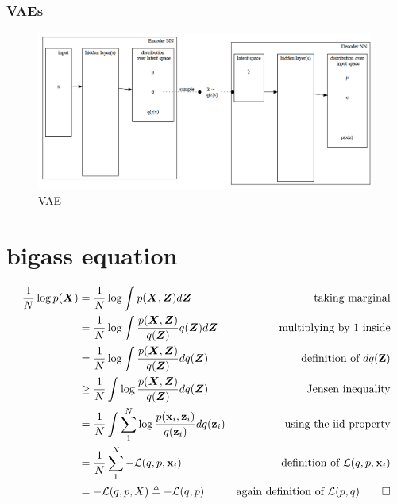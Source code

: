 \documentclass[final]{beamer}
\newcommand{\x}{\mathbf{x}}
\newcommand{\Z}{\mathbf{Z}}
\newcommand{\z}{\mathbf{z}}
\newcommand{\LL}{\mathcal{L}}
\newcommand{\bv}[1]{\boldsymbol{#1}}
\begin{document}
\begin{frame}
\frametitle{VAEs}
\begin{figure}[h]
\centering
\includegraphics[width=0.99\textwidth]{./plots/vaeNN.gv.png}
\caption{VAE}
\label{fig:vae}
\end{figure}
\end{frame}



\section{bigass equation}

\begin{frame}

{\tiny
\begin{equation}
\label{eq:elbo}
\begin{aligned}
\frac{1}{N} \log p(\bv{X}) &= \frac{1}{N} \log \int p(\bv{X},\bv{Z}) d\bv{Z} 
& \text{taking marginal} \\
& = \frac{1}{N} \log \int \frac{p(\bv{X},\bv{Z})}{q(\bv{Z})} q(\bv{Z})d\bv{Z} 
& \text{multiplying by 1 inside}\\
&=  \frac{1}{N} \log \int \frac{p(\bv{X},\bv{Z})}{q(\bv{Z})}dq(\bv{Z}) 
& \text{definition of } dq(\Z)\\
&\geq  \frac{1}{N} \int \log \frac{p(\bv{X},\bv{Z})}{q(\bv{Z})}dq(\bv{Z}) 
& \text{Jensen inequality}\\
&= \frac{1}{N} \int \sum_1^N \log \frac{p(\x_i, \z_i)}{q(\z_i)}dq(\z_i) 
& \text{using the iid property}\\
&= \frac{1}{N} \sum_1^N - \LL(q,p,\x_i)
& \text{definition of } \LL(q,p,\x_i)\\
& = -\mathcal{L}(q,p,X) \triangleq -\mathcal{L}(q,p)
& \text{again definition of } \LL(p,q) \qed
\end{aligned}
\end{equation}
}
\end{frame}
\end{document}
